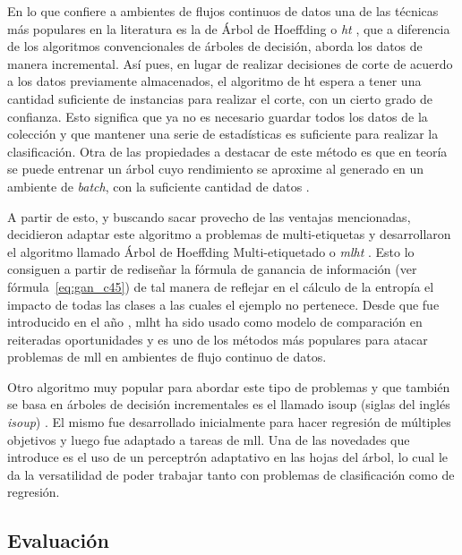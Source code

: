 En lo que confiere a ambientes de flujos continuos de datos una de las técnicas
más populares en la literatura es la de Árbol de Hoeffding o
\textit{\acrfull{ht}} \cite{domingos_mining_2002}, que a diferencia de los
algoritmos convencionales de árboles de decisión, aborda los datos de manera
incremental. Así pues, en lugar de realizar decisiones de corte de acuerdo a los
datos previamente almacenados, el algoritmo de \acrshort{ht} espera a tener una
cantidad suficiente de instancias para realizar el corte, con un cierto grado de
confianza. Esto significa que ya no es necesario guardar todos los datos de la
colección y que mantener una serie de estadísticas es suficiente para realizar
la clasificación. Otra de las propiedades a destacar de este método es que en
teoría se puede entrenar un árbol cuyo rendimiento se aproxime al generado en un
ambiente de \textit{batch}, con la suficiente cantidad de datos
\cite{bifet_machine_2018}.

A partir de esto, y buscando sacar provecho de las ventajas mencionadas,
\citeauthor{read_scalable_2012} decidieron adaptar este algoritmo a problemas de
multi-etiquetas y desarrollaron el algoritmo llamado Árbol de Hoeffding
Multi-etiquetado o \textit{\acrfull{mlht}} \cite{read_scalable_2012}. Esto lo
consiguen a partir de rediseñar la fórmula de ganancia de información (ver
fórmula~\ref{eq:gan_c45}) de tal manera de reflejar en el cálculo de la entropía
el impacto de todas las clases a las cuales el ejemplo no pertenece. Desde que
fue introducido en el año \citeyear{read_scalable_2012}, \acrshort{mlht} ha sido
usado como modelo de comparación en reiteradas oportunidades
\cite{sousa_multi-label_2018} y es uno de los métodos más populares para atacar
problemas de \acrshort{mll} en ambientes de flujo continuo de datos.

Otro algoritmo muy popular para abordar este tipo de problemas y que también se
basa en árboles de decisión incrementales es el llamado \acrshort{isoup} (siglas
del inglés \textit{\acrlong{isoup}}) \cite{osojnik_multi-label_2017}. El mismo
fue desarrollado inicialmente para hacer regresión de múltiples objetivos y
luego fue adaptado a tareas de \acrshort{mll}. Una de las novedades que
introduce es el uso de un perceptrón adaptativo en las hojas del árbol, lo cual
le da la versatilidad de poder trabajar tanto con problemas de clasificación
como de regresión.


\subsection{Evaluación}
\label{mll_evaluacion}

